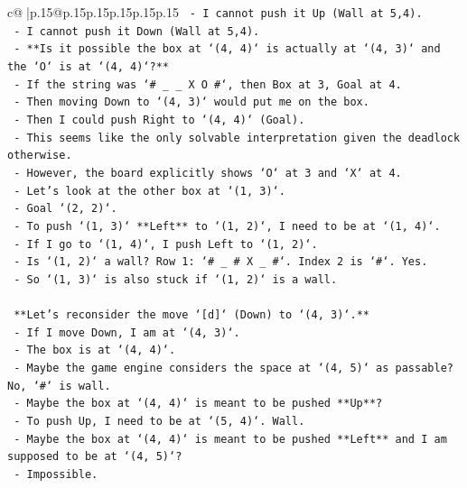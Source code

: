 \documentclass{article}
\begin{document}
{\begin{supertabular}{c@{$\;$}|p{.15\linewidth}@{}p{.15\linewidth}p{.15\linewidth}p{.15\linewidth}p{.15\linewidth}p{.15\linewidth}}
{{{\texttt{        {-}   I cannot push it Up (Wall at 5,4).} \\
\texttt{        {-}   I cannot push it Down (Wall at 5,4).} \\
\texttt{    {-}   **Is it possible the box at `(4, 4)` is actually at `(4, 3)` and the `O` is at `(4, 4)`?**} \\
\texttt{        {-}   If the string was `\# \_ \_ X O \#`, then Box at 3, Goal at 4.} \\
\texttt{        {-}   Then moving Down to `(4, 3)` would put me on the box.} \\
\texttt{        {-}   Then I could push Right to `(4, 4)` (Goal).} \\
\texttt{        {-}   This seems like the only solvable interpretation given the deadlock otherwise.} \\
\texttt{        {-}   However, the board explicitly shows `O` at 3 and `X` at 4.} \\
\texttt{        {-}   Let's look at the other box at `(1, 3)`.} \\
\texttt{        {-}   Goal `(2, 2)`.} \\
\texttt{        {-}   To push `(1, 3)` **Left** to `(1, 2)`, I need to be at `(1, 4)`.} \\
\texttt{        {-}   If I go to `(1, 4)`, I push Left to `(1, 2)`.} \\
\texttt{        {-}   Is `(1, 2)` a wall? Row 1: `\# \_ \# X \_ \#`. Index 2 is `\#`. Yes.} \\
\texttt{        {-}   So `(1, 3)` is also stuck if `(1, 2)` is a wall.} \\
\\ 
\texttt{    **Let's reconsider the move `{[}d{]}` (Down) to `(4, 3)`.**} \\
\texttt{    {-}   If I move Down, I am at `(4, 3)`.} \\
\texttt{    {-}   The box is at `(4, 4)`.} \\
\texttt{    {-}   Maybe the game engine considers the space at `(4, 5)` as passable? No, `\#` is wall.} \\
\texttt{    {-}   Maybe the box at `(4, 4)` is meant to be pushed **Up**?} \\
\texttt{        {-}   To push Up, I need to be at `(5, 4)`. Wall.} \\
\texttt{    {-}   Maybe the box at `(4, 4)` is meant to be pushed **Left** and I am supposed to be at `(4, 5)`?} \\
\texttt{        {-}   Impossible.} \\
}}}
\end{supertabular}}
\end{document}
